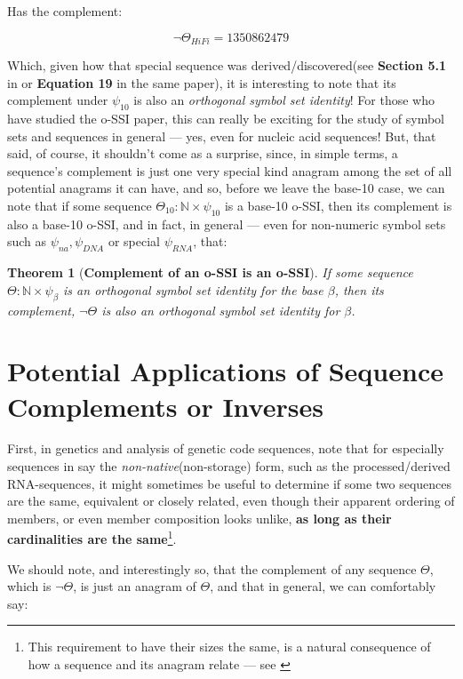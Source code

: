 \documentclass[a4paper, 18pt]{book} %
\newtheorem{theo}{Theorem}
\begin{document}
Has the complement:


\begin{equation}
\lnot\Theta_{HiFi} = 1 3 5 0 8 6 2 4 7 9
\end{equation}

Which, given how that special sequence was derived/discovered(see \textbf{Section 5.1} in \cite{ossipaper} or \textbf{Equation 19} in the same paper), it is interesting to note that its complement under $\psi_{10}$ is also an \textit{orthogonal symbol set identity}! For those who have studied the o-SSI paper\cite{ossipaper}, this can really be exciting for the study of symbol sets and sequences in general --- yes, even for nucleic acid sequences! But, that said, of course, it shouldn't come as a surprise, since, in simple terms, a sequence's complement is just one very special kind anagram among the set of all potential anagrams it can have, and so, before we leave the base-10 case, we can note that if some sequence $\Theta_{10}: \mathbb{N} \times \psi_{10}$ is a base-10 o-SSI, then its complement is also a base-10 o-SSI, and in fact, in general --- even for non-numeric symbol sets such as $\psi_{na}, \psi_{DNA}$ or special $\psi_{RNA}$, that:


\begin{theo}[\textbf{Complement of an o-SSI is an o-SSI}]
If some sequence $\Theta: \mathbb{N} \times \psi_\beta$ is an orthogonal symbol set identity for the base $\beta$, then its complement, $\lnot\Theta$ is also an orthogonal symbol set identity for $\beta$.
\end{theo}

\section{Potential Applications of Sequence Complements or Inverses}
\label{SECAPPCOMPLEMENTS}

First, in genetics and analysis of genetic code sequences, note that for especially sequences in say the \textit{non-native}(non-storage) form, such as the processed/derived RNA-sequences, it might sometimes be useful to determine if some two sequences are the same, equivalent or closely related, even though their apparent ordering of members, or even member composition looks unlike, \textbf{as long as their cardinalities are the same}\footnote{This requirement to have their sizes the same, is a natural consequence of how a sequence and its anagram relate --- see \cite{adtpaper}}.

We should note, and interestingly so, that the complement of any sequence $\Theta$, which is $\lnot\Theta$, is just an anagram of $\Theta$, and that in general, we can comfortably say:
\end{document}
